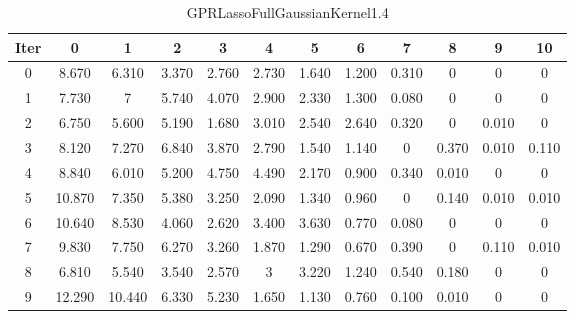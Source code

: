 \begin{table}
	\begin{center}
		\begin{tabular}{|c|c|c|c|c|c|c|c|c|c|c|c|}
			\hline
			Iter & 0 & 1 & 2 & 3 & 4 & 5 & 6 & 7 & 8 & 9 & 10 \\
			\hline
			0 & 8.670 & 6.310 & 3.370 & 2.760 & 2.730 & 1.640 & 1.200 & 0.310 & 0 & 0 & 0 \\
			\hline
			1 & 7.730 & 7 & 5.740 & 4.070 & 2.900 & 2.330 & 1.300 & 0.080 & 0 & 0 & 0 \\
			\hline
			2 & 6.750 & 5.600 & 5.190 & 1.680 & 3.010 & 2.540 & 2.640 & 0.320 & 0 & 0.010 & 0 \\
			\hline
			3 & 8.120 & 7.270 & 6.840 & 3.870 & 2.790 & 1.540 & 1.140 & 0 & 0.370 & 0.010 & 0.110 \\
			\hline
			4 & 8.840 & 6.010 & 5.200 & 4.750 & 4.490 & 2.170 & 0.900 & 0.340 & 0.010 & 0 & 0 \\
			\hline
			5 & 10.870 & 7.350 & 5.380 & 3.250 & 2.090 & 1.340 & 0.960 & 0 & 0.140 & 0.010 & 0.010 \\
			\hline
			6 & 10.640 & 8.530 & 4.060 & 2.620 & 3.400 & 3.630 & 0.770 & 0.080 & 0 & 0 & 0 \\
			\hline
			7 & 9.830 & 7.750 & 6.270 & 3.260 & 1.870 & 1.290 & 0.670 & 0.390 & 0 & 0.110 & 0.010 \\
			\hline
			8 & 6.810 & 5.540 & 3.540 & 2.570 & 3 & 3.220 & 1.240 & 0.540 & 0.180 & 0 & 0 \\
			\hline
			9 & 12.290 & 10.440 & 6.330 & 5.230 & 1.650 & 1.130 & 0.760 & 0.100 & 0.010 & 0 & 0 \\
			\hline
		\end{tabular}
	\end{center}
	\caption{GPRLassoFullGaussianKernel1.4}
\end{table}